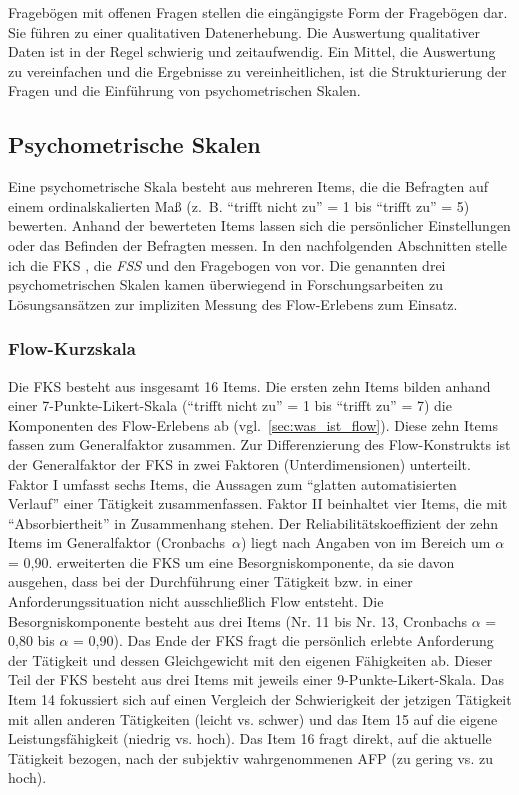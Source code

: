 Fragebögen mit offenen Fragen stellen die eingängigste Form der Fragebögen dar. Sie führen zu einer qualitativen Datenerhebung. Die Auswertung qualitativer Daten ist in der Regel schwierig und zeitaufwendig. Ein Mittel, die Auswertung zu vereinfachen und die Ergebnisse zu vereinheitlichen, ist die Strukturierung der Fragen und die Einführung von psychometrischen Skalen.

\subsection{Psychometrische Skalen}
Eine psychometrische Skala besteht aus mehreren Items, die die Befragten auf einem ordinalskalierten Maß (z.~B. "`trifft nicht zu"' = 1 bis "`trifft zu"' = 5) bewerten. Anhand der bewerteten Items lassen sich die persönlicher Einstellungen oder das Befinden der Befragten messen. In den nachfolgenden Abschnitten stelle ich die \ac{FKS} \citep{Rheinberg2003}, die \emph{\ac{FSS}} \citep{Jackson1996} und den Fragebogen von \citet{Keller2008} vor. Die genannten drei psychometrischen Skalen kamen überwiegend in Forschungsarbeiten zu Lösungsansätzen zur impliziten Messung des Flow-Erlebens zum Einsatz.

\subsubsection{Flow-Kurzskala}

Die \ac{FKS} besteht aus insgesamt 16 Items. Die ersten zehn Items bilden anhand einer 7-Punkte-Likert-Skala ("`trifft nicht zu"' = 1 bis "`trifft zu"' = 7) die Komponenten des Flow-Erlebens ab (vgl.~\ref{sec:was_ist_flow}). Diese zehn Items fassen \citet{Rheinberg2003} zum Generalfaktor zusammen. Zur Differenzierung des Flow-Konstrukts ist der Generalfaktor der \ac{FKS} in zwei Faktoren (Unterdimensionen) unterteilt. Faktor I umfasst sechs Items, die Aussagen zum "`glatten automatisierten Verlauf"' einer Tätigkeit zusammenfassen. Faktor II beinhaltet vier Items, die mit "`Absorbiertheit"' in Zusammenhang stehen. Der Reliabilitätskoeffizient der zehn Items im Generalfaktor (Cronbachs~$\alpha$) liegt nach Angaben von \citet[S.~9]{Rheinberg2003} im Bereich um $\alpha$ = 0,90. \citet{Rheinberg2003} erweiterten die \ac{FKS} um eine Besorgniskomponente, da sie davon ausgehen, dass bei der Durchführung einer Tätigkeit bzw. in einer Anforderungssituation nicht ausschließlich Flow entsteht. Die Besorgniskomponente besteht aus drei Items (Nr. 11 bis Nr. 13, Cronbachs $\alpha$ = 0,80 bis $\alpha$ = 0,90). Das Ende der \ac{FKS} fragt die persönlich erlebte Anforderung der Tätigkeit und dessen Gleichgewicht mit den eigenen Fähigkeiten ab. Dieser Teil der \ac{FKS} besteht aus drei Items mit jeweils einer 9-Punkte-Likert-Skala. Das Item 14 fokussiert sich auf einen Vergleich der Schwierigkeit der jetzigen Tätigkeit mit allen anderen Tätigkeiten (leicht vs. schwer) und das Item 15 auf die eigene Leistungsfähigkeit (niedrig vs. hoch). Das Item 16 fragt direkt, auf die aktuelle Tätigkeit bezogen, nach der subjektiv wahrgenommenen \ac{AFP} (zu gering vs. zu hoch).

